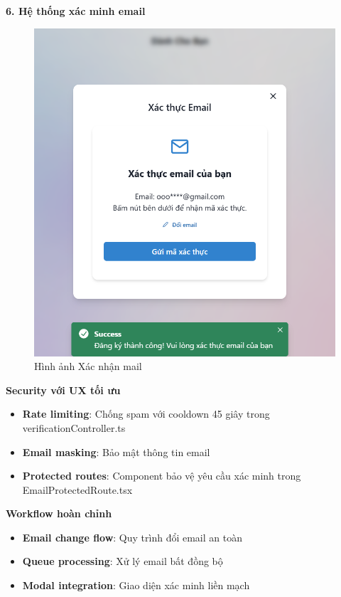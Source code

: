 \textbf{6. Hệ thống xác minh email}
\begin{figure}[H]
    \centering
    \includegraphics[width=1\textwidth]{image/thucnghiem/mail.png}
    \caption{Hình ảnh Xác nhận mail}
    \label{fig:xac_nhan}
\end{figure}
\textbf{Security với UX tối ưu}
\begin{itemize}
    \item \textbf{Rate limiting}: Chống spam với cooldown 45 giây trong verificationController.ts
    \item \textbf{Email masking}: Bảo mật thông tin email
    \item \textbf{Protected routes}: Component bảo vệ yêu cầu xác minh trong EmailProtectedRoute.tsx
\end{itemize}

\textbf{Workflow hoàn chỉnh}
\begin{itemize}
    \item \textbf{Email change flow}: Quy trình đổi email an toàn
    \item \textbf{Queue processing}: Xử lý email bất đồng bộ
    \item \textbf{Modal integration}: Giao diện xác minh liền mạch
\end{itemize}


